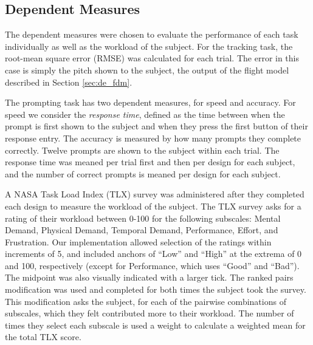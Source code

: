 \subsection{Dependent Measures}
\label{sec:de_dependent}

The dependent measures were chosen to evaluate the performance of each task individually as well as the workload of the subject.
For the tracking task, the root-mean square error (RMSE) was calculated for each trial.
The error in this case is simply the pitch shown to the subject, the output of the flight model described in Section \ref{sec:de_fdm}.

The prompting task has two dependent measures, for speed and accuracy.
For speed we consider the \textit{response time}, defined as the time between when the prompt is first shown to the subject and when they press the first button of their response entry.
The accuracy is measured by how many prompts they complete correctly.
Twelve prompts are shown to the subject within each trial.
The response time was meaned per trial first and then per design for each subject, and the number of correct prompts is meaned per design for each subject.

A NASA Task Load Index (TLX) survey was administered after they completed each design to measure the workload of the subject.
The TLX survey asks for a rating of their workload between 0-100 for the following subscales: Mental Demand, Physical Demand, Temporal Demand, Performance, Effort, and Frustration.
Our implementation allowed selection of the ratings within increments of 5, and included anchors of ``Low'' and ``High'' at the extrema of 0 and 100, respectively (except for Performance, which uses ``Good'' and ``Bad'').
The midpoint was also visually indicated with a larger tick.
The ranked pairs modification was used and completed for both times the subject took the survey.
This modification asks the subject, for each of the pairwise combinations of subscales, which they felt contributed more to their workload.
The number of times they select each subscale is used a weight to calculate a weighted mean for the total TLX score.

